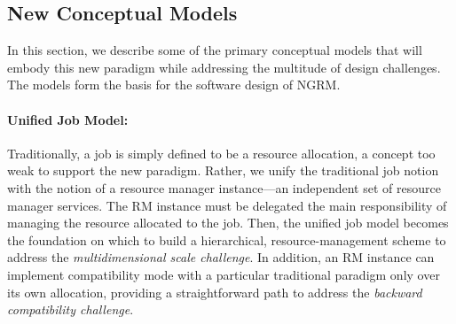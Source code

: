 \documentclass[10pt]{article}
\newcommand{\ngrm}{NGRM}
\begin{document}
\subsection{New Conceptual Models}
\label{sect:models}
In this section, we describe some of the primary conceptual models that will embody 
this new paradigm while addressing the multitude of design challenges. 
The models form the basis for the software design of \ngrm.

\paragraph{Unified Job Model:}
Traditionally, a job is simply defined to be a resource allocation, 
a concept too weak to support the new paradigm. 
Rather, we unify the traditional job notion 
with the notion of a resource manager instance---an independent set of resource manager services.
The RM instance must be delegated the main responsibility of managing the resource allocated to the job.
Then, the unified job model becomes the foundation
on which to build a hierarchical, resource-management 
scheme to address the {\sl multidimensional scale challenge}.
In addition, an RM instance can implement compatibility mode with a particular 
traditional paradigm only over its own allocation, providing a straightforward path to address
the {\sl backward compatibility challenge}. 
\end{document}
